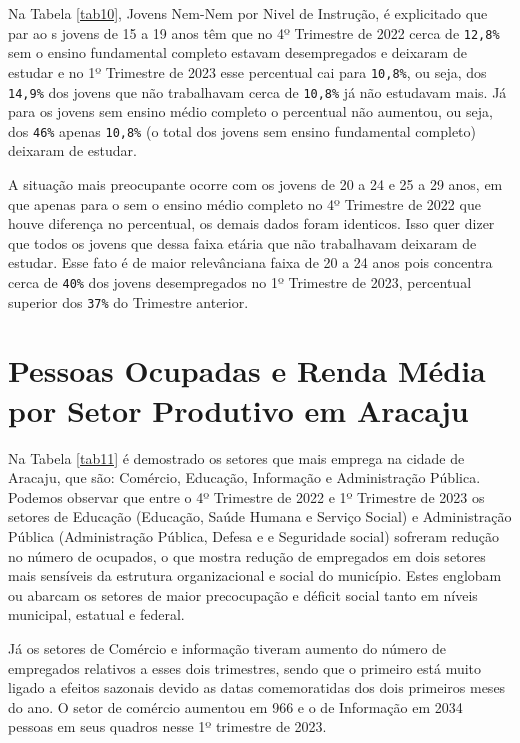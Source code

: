 \documentclass[
  12pt,
  a4paper,
]{article}
\begin{document}
Na Tabela \ref{tab10}, Jovens Nem-Nem por Nivel de Instrução, é
explicitado que par ao s jovens de 15 a 19 anos têm que no 4º Trimestre
de 2022 cerca de \texttt{12,8\%} sem o ensino fundamental completo
estavam desempregados e deixaram de estudar e no 1º Trimestre de 2023
esse percentual cai para \texttt{10,8\%}, ou seja, dos \texttt{14,9\%}
dos jovens que não trabalhavam cerca de \texttt{10,8\%} já não estudavam
mais. Já para os jovens sem ensino médio completo o percentual não
aumentou, ou seja, dos \texttt{46\%} apenas \texttt{10,8\%} (o total dos
jovens sem ensino fundamental completo) deixaram de estudar.

A situação mais preocupante ocorre com os jovens de 20 a 24 e 25 a 29
anos, em que apenas para o sem o ensino médio completo no 4º Trimestre
de 2022 que houve diferença no percentual, os demais dados foram
identicos. Isso quer dizer que todos os jovens que dessa faixa etária
que não trabalhavam deixaram de estudar. Esse fato é de maior
relevânciana faixa de 20 a 24 anos pois concentra cerca de \texttt{40\%}
dos jovens desempregados no 1º Trimestre de 2023, percentual superior
dos \texttt{37\%} do Trimestre anterior.

\hypertarget{pessoas-ocupadas-e-renda-muxe9dia-por-setor-produtivo-em-aracaju}{%
\section{Pessoas Ocupadas e Renda Média por Setor Produtivo em
Aracaju}\label{pessoas-ocupadas-e-renda-muxe9dia-por-setor-produtivo-em-aracaju}}

Na Tabela \ref{tab11} é demostrado os setores que mais emprega na cidade
de Aracaju, que são: Comércio, Educação, Informação e Administração
Pública. Podemos observar que entre o 4º Trimestre de 2022 e 1º
Trimestre de 2023 os setores de Educação (Educação, Saúde Humana e
Serviço Social) e Administração Pública (Administração Pública, Defesa e
e Seguridade social) sofreram redução no número de ocupados, o que
mostra redução de empregados em dois setores mais sensíveis da estrutura
organizacional e social do município. Estes englobam ou abarcam os
setores de maior precocupação e déficit social tanto em níveis
municipal, estatual e federal.

Já os setores de Comércio e informação tiveram aumento do número de
empregados relativos a esses dois trimestres, sendo que o primeiro está
muito ligado a efeitos sazonais devido as datas comemoratidas dos dois
primeiros meses do ano. O setor de comércio aumentou em 966 e o de
Informação em 2034 pessoas em seus quadros nesse 1º trimestre de 2023.
\end{document}
